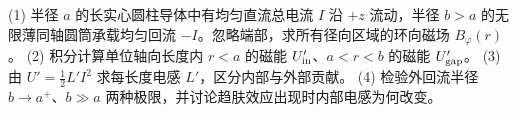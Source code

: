 (1) 半径 \(a\) 的长实心圆柱导体中有均匀直流总电流 \(I\) 沿 \(+z\) 流动，半径 \(b>a\) 的无限薄同轴圆筒承载均匀回流 \(-I\)。忽略端部，求所有径向区域的环向磁场 \(B_\varphi(r)\)。
(2) 积分计算单位轴向长度内 \(r<a\) 的磁能 \(U'_{\rm in}\)、\(a<r<b\) 的磁能 \(U'_{\rm gap}\)。
(3) 由 \(U'=\tfrac12L'I^2\) 求每长度电感 \(L'\)，区分内部与外部贡献。
(4) 检验外回流半径 \(b\to a^+\)、\(b\gg a\) 两种极限，并讨论趋肤效应出现时内部电感为何改变。
